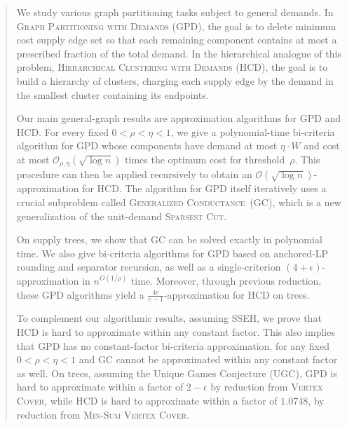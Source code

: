 \begin{abstract}
  We study various graph partitioning tasks subject to general demands. In \textsc{Graph Partitioning with Demands} (GPD), the goal is to delete minimum cost supply edge set so that each remaining component contains at most a prescribed fraction of the total demand. In the hierarchical analogue of this problem, \textsc{Hierarchical Clustering with Demands} (HCD), the goal is to build a hierarchy of clusters, charging each supply edge by the demand in the smallest cluster containing its endpoints.

  Our main general-graph results are approximation algorithms for GPD and HCD. For every fixed $0<\rho<\eta<1$, we give a polynomial-time bi-criteria algorithm for GPD whose components have demand at most $\eta \cdot W$ and cost at most $\mathcal{O}_{\rho,\eta}(\sqrt{\log n})$ times the optimum cost for threshold~$\rho$. This procedure can then be applied recursively to obtain an $\mathcal{O}(\sqrt{\log n})$-approximation for HCD. The algorithm for GPD itself iteratively uses a crucial subproblem called \textsc{Generalized Conductance}~(GC), which is a new generalization of the unit-demand \textsc{Sparsest Cut}.

  On supply trees, we show that GC can be solved exactly in polynomial time. We also give bi-criteria algorithms for GPD based on anchored-LP rounding and separator recursion, as well as a single-criterion $(4+\epsilon)$-approximation in $n^{O(1/\rho)}$ time. Moreover, through previous reduction, these GPD algorithms yield a $\frac{4e}{e-1}$-approximation for HCD on trees.

  To complement our algorithmic results, assuming SSEH, we prove that HCD is hard to approximate within any constant factor. This also implies that GPD has no constant-factor bi-criteria approximation, for any fixed $0<\rho<\eta<1$ and GC cannot be approximated within any constant factor as well. 
  On trees, assuming the Unique Games Conjecture (UGC), GPD is hard to approximate within a factor of $2-\epsilon$ by reduction from \textsc{Vertex Cover}, while HCD is hard to approximate within a factor of $1.0748$, by reduction from \textsc{Min-Sum Vertex Cover}.
\end{abstract}

